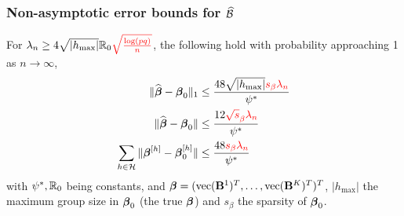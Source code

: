 \documentclass[10pt]{beamer}
\theoremstyle{definition}
\DeclareMathOperator*{\argmin}{argmin}
\DeclareMathOperator*{\ve}{vec}
\begin{document}
%
%
%
%

\begin{frame}
\frametitle{Non-asymptotic error bounds for $\widehat {{\cal{B}}}$}

For $\lambda_n \geq 4 \sqrt{| h_{\max} |} {\mathbb{R}}_0 {\color{red} \sqrt{ \frac{ \log(pq)}{n}}}$, the following hold with probability approaching 1 as $n \rightarrow \infty$,
%
\begin{align*}
\| \widehat {{\boldsymbol{\beta}}} - {\boldsymbol{\beta}}_0 \|_1 & \leq \frac{48 \sqrt{ | h_{\max} |} {\color{red} s_\beta \lambda_n}}{ \psi^*} \\
\| \widehat {{\boldsymbol{\beta}}} - {\boldsymbol{\beta}}_0 \| & \leq \frac{12 {\color{red} \sqrt s_\beta \lambda_n}}{ \psi^*} \\
\sum_{h \in {\cal{H}}} \| {\boldsymbol{\beta}}^{[h]} - {\boldsymbol{\beta}}_0^{[h]} \| & \leq \frac{48 {\color{red} s_\beta \lambda_n}}{ \psi^*}
\end{align*}
%
with $\psi^*, {\mathbb{R}}_0$ being constants, and $\bfbeta = (\ve(\bfB^1)^T, \ldots, \ve(\bfB^K)^T)^T$, $| h_{\max} |$ the maximum group size in ${\boldsymbol{\beta}}_0$ (the true ${\boldsymbol{\beta}}$) and $s_\beta$ the sparsity of ${\boldsymbol{\beta}}_0$.
\end{frame}
\end{document}

